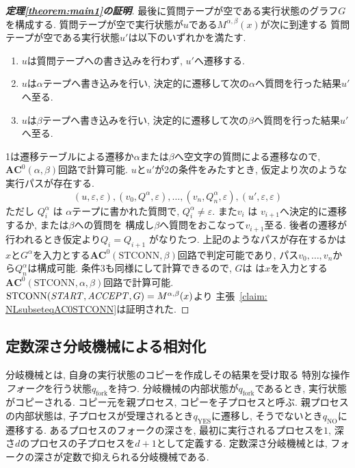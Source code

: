 \documentclass[11pt,a4paper]{jsarticle}
\theoremstyle{definition}
\theoremstyle{remark}
\newcommand{\classfont}{\mathbf}
\newcommand{\AC}{\classfont{AC}}
\newcommand{\probfont}{\text}
\newcommand{\STCONN}{\probfont{STCONN}}
\newcommand{\emptystring}{\varepsilon}
\begin{document}
\begin{proof}[\bf 定理\ref{theorem:main1}の証明]
最後に質問テープが空である実行状態のグラフ$G$を構成する.
質問テープが空で実行状態が$u$である$M^{\alpha, \beta}(x)$が次に到達する
質問テープが空である実行状態$u'$は以下のいずれかを満たす.
\begin{enumerate}
 \item $u$は質問テープへの書き込みを行わず, $u'$へ遷移する.
 \item $u$は$\alpha$テープへ書き込みを行い,
       決定的に遷移して次の$\alpha$へ質問を行った結果$u'$へ至る.
 \item $u$は$\beta$テープへ書き込みを行い,
       決定的に遷移して次の$\beta$へ質問を行った結果$u'$へ至る.
\end{enumerate}
1は遷移テーブルによる遷移か$\alpha$または$\beta$へ空文字の質問による遷移なので,
$\AC^0(\alpha, \beta)$回路で計算可能.
$u$と$u'$が2の条件をみたすとき, 仮定より次のような実行パスが存在する.
\begin{equation*}
 (u, \varepsilon, \varepsilon), (v_0, Q^\alpha, \varepsilon), \dots, 
  (v_n, Q^\alpha_n, \emptystring), (u', \varepsilon, \emptystring)
\end{equation*}
ただし $Q^\alpha_i$ は $\alpha$テープに書かれた質問で,
$Q^\alpha_i \not = \varepsilon$.
また$v_i$ は $v_{i+1}$へ決定的に遷移するか, または$\beta$への質問を
構成し$\beta$へ質問をおこなって$v_{i+1}$至る.
後者の遷移が行われるとき仮定より$Q_i = Q_{i+1}$ がなりたつ.
上記のようなパスが存在するかは$x$と$G^\alpha$を入力とする$\AC^0(\STCONN, \beta)$回路で判定可能であり, パス$v_0, \dots, v_n$から$Q^\alpha_n$は構成可能.
条件3も同様にして計算できるので, $G$は
は$x$を入力とする$\AC^0(\STCONN, \alpha, \beta)$回路で計算可能.
$\STCONN(\start, \accept, G) = M^{\alpha, \beta}(x)$より
主張~\ref{claim: NLsubseteqAC0STCONN}は証明された. 
\end{proof}


\subsection{定数深さ分岐機械による相対化}
\label{subsection: constant depth fork}
分岐機械とは, 自身の実行状態のコピーを作成しその結果を受け取る
特別な操作\emph{フォーク}を行う状態$q_{\text{fork}}$を持つ.
分岐機械の内部状態が$q_{\text{fork}}$であるとき, 実行状態がコピーされる.
コピー元を親プロセス, コピーを子プロセスと呼ぶ.
親プロセスの内部状態は, 子プロセスが受理されるとき$q_{\text{YES}}$に遷移し, 
そうでないとき$q_{\text{NO}}$に遷移する.
あるプロセスのフォークの深さを,
最初に実行されるプロセスを$1$,
深さ$d$のプロセスの子プロセスを$d+1$として定義する.
定数深さ分岐機械とは, フォークの深さが定数で抑えられる分岐機械である.
\end{document}
